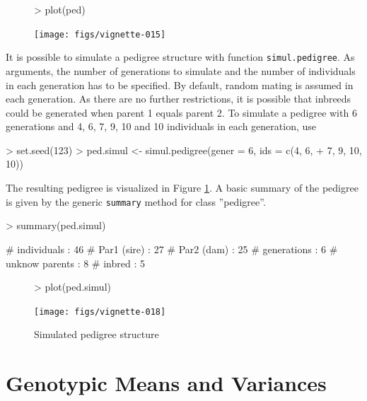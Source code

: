 \documentclass[a4paper,11pt]{article}
\begin{document}
\begin{figure}[!ht] 
\begin{Schunk}
\begin{Sinput}
> plot(ped)
\end{Sinput}
\end{Schunk}
\texttt{[image: figs/vignette-015]}
\end{figure}    
      
It is possible to simulate a pedigree structure with function \texttt{simul.pedigree}. As arguments,
the number of generations to simulate and the number of individuals in each generation has to be specified. By default, random mating 
is assumed in each generation. As there are no further restrictions, it is possible that inbreeds could be generated when parent 1 equals parent 2.
To simulate a pedigree with 6 generations and 4, 6, 7, 9, 10 and 10 individuals in each generation, use
\begin{Schunk}
\begin{Sinput}
> set.seed(123)
> ped.simul <- simul.pedigree(gener = 6, ids = c(4, 6, 
+     7, 9, 10, 10))
\end{Sinput}
\end{Schunk}
The resulting pedigree is visualized in Figure \ref{fig:simupedi}. A basic summary of the pedigree is given by the generic \texttt{summary} method for class ''pedigree''.
\begin{Schunk}
\begin{Sinput}
> summary(ped.simul)
\end{Sinput}
\begin{Soutput}
# individuals    : 46 
# Par1 (sire)    : 27 
# Par2 (dam)     : 25 
# generations    : 6 
# unknow parents : 8 
# inbred         : 5 
\end{Soutput}
\end{Schunk}

\begin{figure}[!ht]
\begin{Schunk}
\begin{Sinput}
> plot(ped.simul)
\end{Sinput}
\end{Schunk}
\texttt{[image: figs/vignette-018]}
\caption{Simulated pedigree structure}
\label{fig:simupedi}
\end{figure}

\section{Genotypic Means and Variances}\label{sec:theory}
\end{document}
